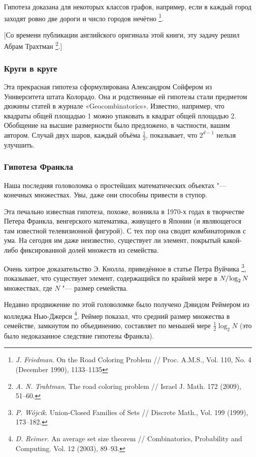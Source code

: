\documentclass[twoside]{book}
\begin{document}
Гипотеза доказана для некоторых классов графов, например, если в каждый город заходят ровно две дороги и число городов нечётно%
\footnote{\emph{J. Friedman}. On the Road Coloring Problem /\!/ {Proc. A.M.S.}, Vol. 110, No. 4 (December 1990), 1133--1135}.

[Со времени публикации английского оригинала этой книги, эту задачу решил Абрам Трахтман%
\footnote{\emph{A. N. Trahtman}. The road coloring problem /\!/ {Israel J. Math.} 172 (2009), 51--60.}.]


\subsubsection*{Круги в круге}

Эта прекрасная гипотеза сформулирована Александром Сойфером из Университета штата Колорадо.
Она и родственные ей гипотезы стали предметом дюжины статей в журнале «Geo\-com\-bi\-na\-tor\-ics».
Известно, например, что квадраты общей площадью 1 можно упаковать в квадрат общей площадью 2.
Обобщение на высшие размерности было предложено, в частности, вашим автором.
Случай двух шаров, каждый объёма $\tfrac12$, показывает, что $2^{d-1}$ нельзя улучшить.

\subsubsection*{Гипотеза Франкла}

Наша последняя головоломка о простейших математических объектах "--- конечных множествах.
Увы, даже они способны привести в ступор.

Эта печально известная гипотеза, похоже, возникла в 1970-х годах в творчестве Петера Франкла, венгерского математика, живущего в Японии (и являющегося там известной телевизионной фигурой).
С тех пор она сводит комбинаториков с ума. 
На сегодня им даже неизвестно, существует ли элемент, покрытый какой-либо фиксированной долей множеств из семейства.

Очень хитрое доказательство Э. Кнолла, приведённое в статье Петра Вуйчика%
\footnote{\emph{P. W\'{o}jcik}. Union-Closed Families of Sets /\!/ {Discrete Math.}, Vol. 199 (1999), 173--182.},
показывает, что существует элемент, содержащийся по крайней мере в $N/\mkern-2mu\log_2 N$ множествах, где $N$ "--- размер семейства.

Недавно продвижение по этой головоломке было получено Дэвидом Реймером из колледжа Нью-Джерси%
\footnote{\emph{D. Reimer}. An average set size theorem /\!/ {Combinatorics, Probability and Computing.} Vol. 12 (2003), 89--93.}.
Реймер показал, что средний размер множества в семействе, замкнутом по объединению, составляет по меньшей мере $\tfrac12\log_2N$ (это было недоказанное следствие гипотезы Франкла).
\end{document}
